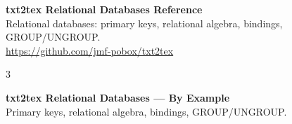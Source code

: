 \documentclass[10pt,landscape,a4paper]{article}
\begin{document}
\begin{center}
{\LARGE\bfseries txt2tex Relational Databases Reference}\\[2pt]
{\small Relational databases: primary keys, relational algebra, bindings, GROUP/UNGROUP.}\\[1pt]
{\footnotesize\color{gray}\url{https://github.com/jmf-pobox/txt2tex}}
\end{center}

\vspace{-2pt}

\begin{multicols}{3}
\raggedcolumns



\end{multicols}

\newpage

\begin{center}
{\LARGE\bfseries txt2tex Relational Databases --- By Example}\\[2pt]
{\small Primary keys, relational algebra, bindings, GROUP/UNGROUP.}
\end{center}

\vspace{-2pt}
\end{document}
